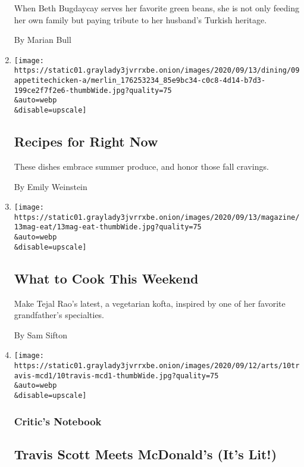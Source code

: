 \begin{enumerate}
  When Beth Bugdaycay serves her favorite green beans, she is not only
  feeding her own family but paying tribute to her husband's Turkish
  heritage.

  By Marian Bull
\item
  \href{/2020/09/11/dining/recipes-for-right-now.html}{}

  \texttt{[image: https://static01.graylady3jvrrxbe.onion/images/2020/09/13/dining/09appetitechicken-a/merlin\_176253234\_85e9bc34-c0c8-4d14-b7d3-199ce2f7f2e6-thumbWide.jpg?quality=75\\\&auto=webp\\\&disable=upscale]}

  \hypertarget{recipes-for-right-now}{%
  \subsection{Recipes for Right Now}\label{recipes-for-right-now}}

  These dishes embrace summer produce, and honor those fall cravings.

  By Emily Weinstein
\item
  \href{/2020/09/11/dining/what-to-cook-this-weekend.html}{}

  \texttt{[image: https://static01.graylady3jvrrxbe.onion/images/2020/09/13/magazine/13mag-eat/13mag-eat-thumbWide.jpg?quality=75\\\&auto=webp\\\&disable=upscale]}

  \hypertarget{what-to-cook-this-weekend}{%
  \subsection{What to Cook This
  Weekend}\label{what-to-cook-this-weekend}}

  Make Tejal Rao's latest, a vegetarian kofta, inspired by one of her
  favorite grandfather's specialties.

  By Sam Sifton
\item
  \href{/2020/09/11/arts/music/travis-scott-mcdonalds.html}{}

  \texttt{[image: https://static01.graylady3jvrrxbe.onion/images/2020/09/12/arts/10travis-mcd1/10travis-mcd1-thumbWide.jpg?quality=75\\\&auto=webp\\\&disable=upscale]}

  \hypertarget{critics-notebook}{%
  \subsubsection{Critic's Notebook}\label{critics-notebook}}

  \hypertarget{travis-scott-meets-mcdonalds-its-lit}{%
  \subsection{Travis Scott Meets McDonald's (It's
  Lit!)}\label{travis-scott-meets-mcdonalds-its-lit}}


\end{enumerate}
